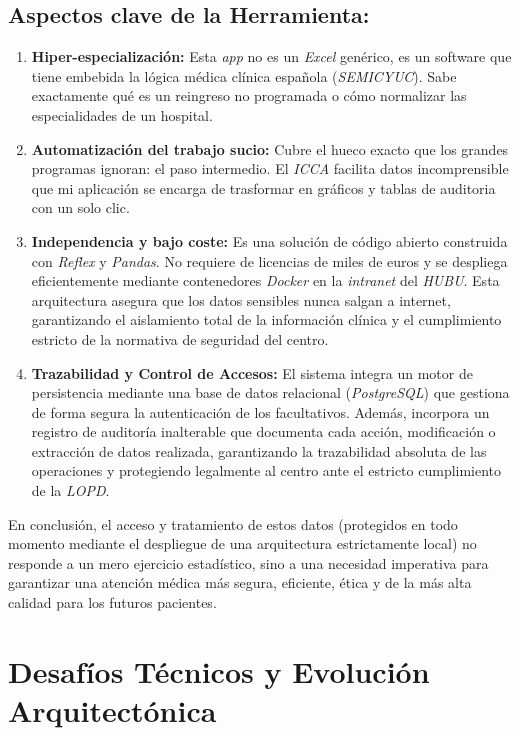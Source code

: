 \subsection{Aspectos clave de la Herramienta:}
\begin{enumerate}
        \item \textbf{Hiper-especialización:} Esta \textit{app} no es un \textit{Excel} genérico, es un software que tiene embebida la lógica médica clínica española (\textit{SEMICYUC}). Sabe exactamente qué es un reingreso no programada o cómo normalizar las especialidades de un hospital.
        \item \textbf{Automatización del trabajo sucio:} Cubre el hueco exacto que los grandes programas ignoran: el paso intermedio. El \textit{ICCA} facilita datos incomprensible que mi aplicación se encarga de trasformar en gráficos y tablas de auditoria con un solo clic.
        \item \textbf{Independencia y bajo coste:} Es una solución de código abierto construida con \textit{Reflex} y \textit{Pandas}. No requiere de licencias de miles de euros y se despliega eficientemente mediante contenedores \textit{Docker} en la \textit{intranet} del \textit{HUBU}. Esta arquitectura asegura que los datos sensibles nunca salgan a internet, garantizando el aislamiento total de la información clínica y el cumplimiento estricto de la normativa de seguridad del centro.
        \item \textbf{Trazabilidad y Control de Accesos:} El sistema integra un motor de persistencia mediante una base de datos relacional (\textit{PostgreSQL}) que gestiona de forma segura la autenticación de los facultativos. Además, incorpora un registro de auditoría inalterable que documenta cada acción, modificación o extracción de datos realizada, garantizando la trazabilidad absoluta de las operaciones y protegiendo legalmente al centro ante el estricto cumplimiento de la \textit{LOPD}.
\end{enumerate}
		
En conclusión, el acceso y tratamiento de estos datos (protegidos en todo momento mediante el despliegue de una arquitectura estrictamente local) no responde a un mero ejercicio estadístico, sino a una necesidad imperativa para garantizar una atención médica más segura, eficiente, ética y de la más alta calidad para los futuros pacientes.

\section{Desafíos Técnicos y Evolución Arquitectónica}

